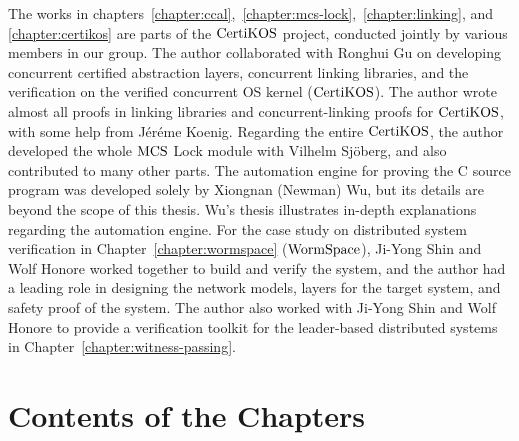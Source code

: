 The works in chapters~\ref{chapter:ccal},~\ref{chapter:mcs-lock},~\ref{chapter:linking}, and \ref{chapter:certikos}  are parts of the $\mathrm{CertiKOS}$ project,
conducted jointly by various members in our group. 
The author collaborated with Ronghui Gu on developing concurrent certified abstraction layers, concurrent linking libraries, and the verification on the verified concurrent OS kernel ($\mathrm{CertiKOS}$). 
The author wrote almost all proofs in linking libraries and concurrent-linking proofs for $\mathrm{CertiKOS}$, with some help from J{\'e}r{\'e}me Koenig. 
Regarding the entire $\mathrm{CertiKOS}$, the author developed the whole $\mathrm{MCS}$ Lock module with Vilhelm Sj{\"o}berg, 
and also contributed to many other parts. 
The automation engine for proving the C source program was developed solely by Xiongnan (Newman) Wu, but its details are beyond the scope of this thesis. 
Wu’s thesis illustrates in-depth explanations regarding the automation engine. 
For the case study on distributed system verification in Chapter~\ref{chapter:wormspace} ($\mathrm{WormSpace}$), Ji-Yong Shin and Wolf Honore worked together to build and verify the system, 
and the author had a leading role in designing the network models, layers for the target system, and safety proof of the system. 
The author also worked with Ji-Yong Shin and Wolf Honore to provide a verification toolkit for the leader-based distributed systems in  Chapter~\ref{chapter:witness-passing}.


\section{Contents of the Chapters}
\label{chapter:introduction:sec:contents-of-the-chapters}

